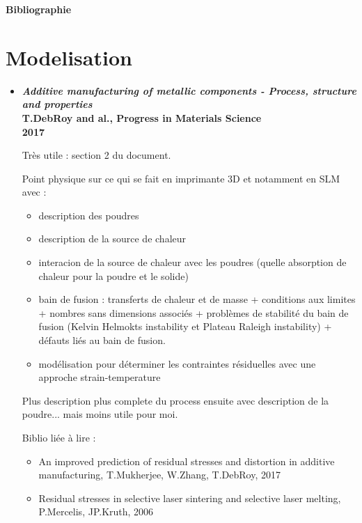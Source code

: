 \documentclass[11pt,a4paper]{article}
\begin{document}
\begin{center}
	\textbf{Bibliographie}
\end{center}


\section{Modelisation}
\begin{itemize}
	\item \textbf{\emph{Additive manufacturing of metallic components - Process, structure and properties} \\
		T.DebRoy and al., Progress in Materials Science \\
		2017} 
	
	\vspace{0cm}
	
	Très utile : section 2 du document.
	
	\vspace{0cm}
	
	Point physique sur ce qui se fait en imprimante 3D et notamment en SLM avec :
	\begin{itemize}
		\item description des poudres
		\item description de la source de chaleur
		\item interacion de la source de chaleur avec les poudres (quelle absorption de chaleur pour la poudre et le solide)
		\item bain de fusion : transferts de chaleur et de masse + conditions aux limites + nombres sans dimensions associés + problèmes de stabilité du bain de fusion (Kelvin Helmokts instability et Plateau Raleigh instability) + défauts liés au bain de fusion.
		\item modélisation pour déterminer les contraintes résiduelles avec une approche strain-temperature
	\end{itemize}
	
	Plus description plus complete du process ensuite avec description de la poudre... mais moins utile pour moi.
	
	\vspace{0cm}
	
	Biblio liée à lire :
	
	\begin{itemize}
		\item An improved prediction of residual stresses and distortion in additive manufacturing, T.Mukherjee, W.Zhang, T.DebRoy, 2017
		
		\item Residual stresses in selective laser sintering and selective laser melting, P.Mercelis, JP.Kruth, 2006
	\end{itemize}
	

\end{itemize}
\end{document}
